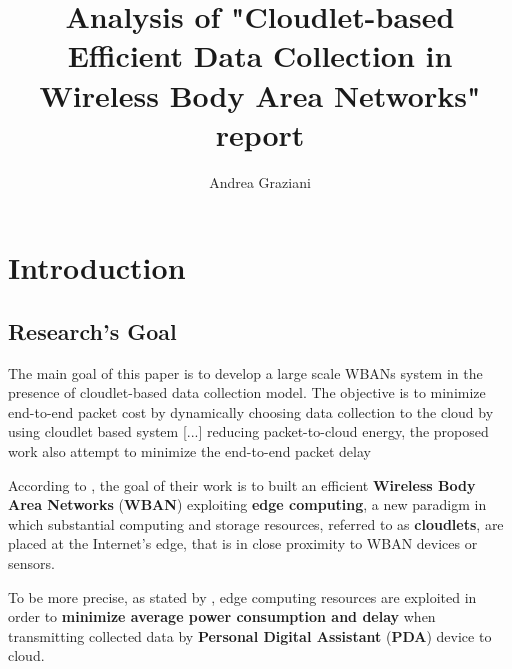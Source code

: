 \documentclass[sigchi]{acmart}
\begin{document}
\title{Analysis of "Cloudlet-based Efficient Data Collection in Wireless Body Area Networks" report}

\author{Andrea Graziani}

\renewcommand{\shortauthors}{Andrea Graziani (0273395)}

\maketitle

\section{Introduction}

\subsection{Research's Goal}

\vspace{0.3cm}

\begin{quoting}[font=itshape, begintext={``}, endtext={''\cite[par.~1.4]{MSAReport}}]
The main goal of this paper is to develop a large scale WBANs system in the presence of cloudlet-based data collection model. The objective is to minimize end-to-end packet cost by dynamically choosing data collection to the cloud by using cloudlet based system [...] reducing packet-to-cloud energy, the proposed work also attempt to minimize the end-to-end packet delay
\end{quoting}

\vspace{0.3cm}

According to \citet{MSAReport}, the goal of their work is to built an efficient \textbf{Wireless Body Area Networks} (\textbf{WBAN}) exploiting \textbf{edge computing}, a new paradigm in which substantial computing and storage resources, referred to as \textbf{cloudlets}, are placed at the Internet's edge, that is in close proximity to WBAN devices or sensors.\cite{TheEmergenceOfEdgeComputing}

To be more precise, as stated by \citet{MSAReport}, edge computing resources are exploited in order to \textbf{minimize average power consumption and delay} when transmitting collected data by \textbf{Personal Digital Assistant} (\textbf{PDA}) device to cloud. 
\end{document}
